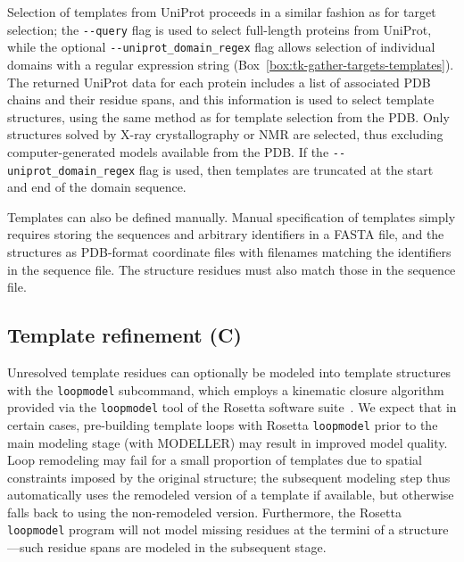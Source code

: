 \documentclass[aps,prl,preprint,nofootinbib,superscriptaddress,linenumbers]{revtex4-1}
\begin{document}
Selection of templates from UniProt proceeds in a similar fashion as for target selection; the {\tt -{}-query} flag is used to select full-length proteins from UniProt, while the optional {\tt -{}-uniprot\_domain\_regex} flag allows selection of individual domains with a regular expression string (Box~\ref{box:tk-gather-targets-templates}).
The returned UniProt data for each protein includes a list of associated PDB chains and their residue spans, and this information is used to select template structures, using the same method as for template selection from the PDB.
Only structures solved by X-ray crystallography or NMR are selected, thus excluding computer-generated models available from the PDB.
If the {\tt -{}-uniprot\_domain\_regex} flag is used, then templates are truncated at the start and end of the domain sequence.

Templates can also be defined manually.
Manual specification of templates simply requires storing the sequences and arbitrary identifiers in a FASTA file, and the structures as PDB-format coordinate files with filenames matching the identifiers in the sequence file.
The structure residues must also match those in the sequence file.

\subsection{Template refinement (C)}

Unresolved template residues can optionally be modeled into template structures with the {\tt loopmodel} subcommand, which employs a kinematic closure algorithm provided via the {\tt loopmodel} tool of the Rosetta software suite~\cite{qian:nature:2007:modeller,wang:jmb:2007:modeller}.
We expect that in certain cases, pre-building template loops with Rosetta {\tt loopmodel} prior to the main modeling stage (with MODELLER) may result in improved model quality.
Loop remodeling may fail for a small proportion of templates due to spatial constraints imposed by the original structure; the subsequent modeling step thus automatically uses the remodeled version of a template if available, but otherwise falls back to using the non-remodeled version.
Furthermore, the Rosetta {\tt loopmodel} program will not model missing residues at the termini of a structure---such residue spans are modeled in the subsequent stage.
\end{document}
